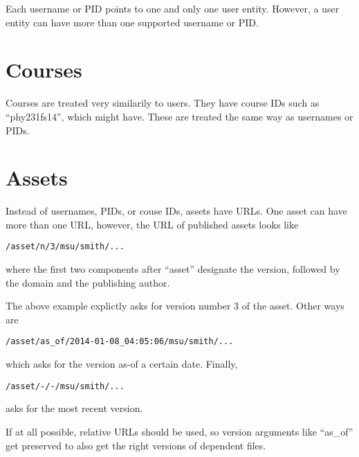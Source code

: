Each username or PID points to one and only one user entity. However, a user entity can have more than one supported username or PID.
\section{Courses}
Courses are treated very similarily to users. They have course IDs such as ``phy231fs14'', which might have. These are treated the same way as usernames or PIDs.
\section{Assets}
Instead of usernames, PIDs, or couse IDs, assets have URLs. One asset can have more than one URL, however, the URL of published assets looks like
\begin{center}
{\tt /asset/n/3/msu/smith/...}
\end{center}
where the first two components after ``asset'' designate the version, followed by the domain and the publishing author.

The above example explictly asks for version number 3 of the asset. Other ways are
\begin{center}
{\tt /asset/as\_of/2014-01-08\_04:05:06/msu/smith/...}
\end{center}
which asks for the version as-of a certain date. Finally,
\begin{center}
{\tt /asset/-/-/msu/smith/...}
\end{center}
asks for the most recent version.

If at all possible, relative URLs should be used, so version arguments like ``as\_of'' get preserved to also get the right versions of dependent files.
